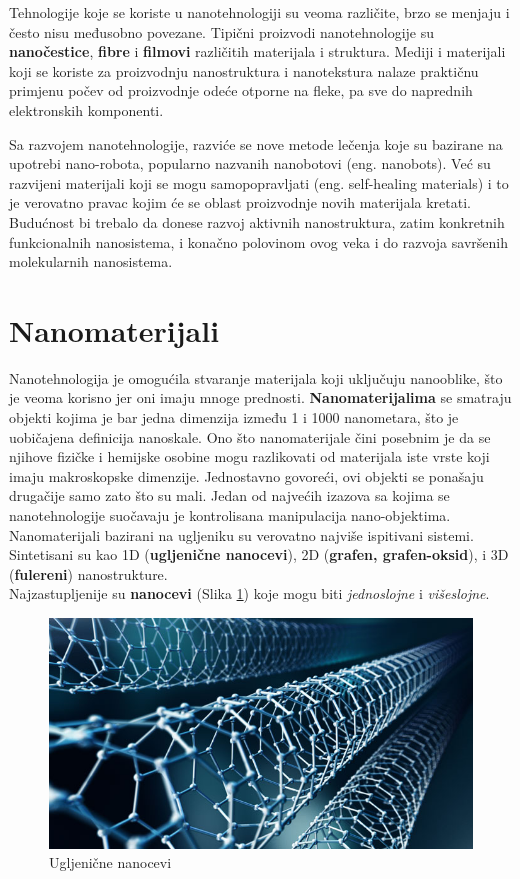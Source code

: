 \documentclass[a4paper]{article}
\begin{document}
{Tehnologije koje se koriste u nanotehnologiji su veoma različite, brzo se menjaju i često nisu međusobno povezane. Tipični proizvodi nanotehnologije su \textbf{nanočestice}, \textbf{fibre} i \textbf{filmovi} različitih materijala i struktura. 
Mediji i materijali koji se koriste za proizvodnju nanostruktura i nanotekstura nalaze praktičnu primjenu počev od proizvodnje odeće otporne na fleke, pa sve do naprednih elektronskih komponenti.

Sa razvojem nanotehnologije, razviće se nove metode lečenja koje su bazirane na upotrebi nano-robota, popularno nazvanih nanobotovi (eng. nanobots). Već su razvijeni materijali koji se mogu samopopravljati (eng. self-healing materials) i to je verovatno pravac kojim će se oblast proizvodnje novih materijala kretati.\\
Budućnost bi trebalo da donese razvoj aktivnih nanostruktura, zatim konkretnih funkcionalnih nanosistema, i konačno polovinom ovog veka i do razvoja savršenih molekularnih nanosistema.

\section{Nanomaterijali}

\sloppy Nanotehnologija je omogućila stvaranje materijala koji uključuju nanooblike, što je veoma korisno jer oni imaju mnoge prednosti. \textbf{Nanomaterijalima} \cite{drugiLink} se smatraju objekti kojima je bar jedna dimenzija između 1 i 1000 nanometara, što je uobičajena definicija nanoskale. Ono što nanomaterijale čini posebnim je da se njihove fizičke i hemijske osobine mogu razlikovati od materijala iste vrste koji imaju makroskopske dimenzije. Jednostavno govoreći, ovi objekti se ponašaju drugačije samo zato što su mali. Jedan od najvećih izazova sa kojima se nanotehnologije suočavaju je kontrolisana manipulacija nano-objektima. Nanomaterijali bazirani na ugljeniku su verovatno najviše ispitivani sistemi. Sintetisani su kao 1D (\textbf{ugljenične nanocevi}), 2D (\textbf{grafen, grafen-oksid}), i 3D (\textbf{fulereni}) nanostrukture.\\
Najzastupljenije su \textbf{nanocevi} (Slika \ref{slika_nanocevi}) koje mogu biti \emph{jednoslojne} i \emph{višeslojne}. 

\begin{figure}[H]
    \centering
    \includegraphics[width=.6\textwidth]{slika 2.jpg}
    \caption{Ugljenične nanocevi}
    \label{slika_nanocevi}
\end{figure}

}
\end{document}

